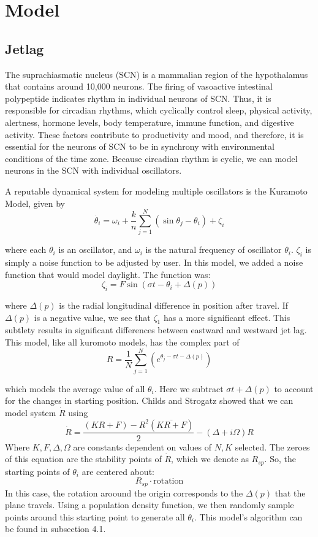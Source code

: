 \section{Model}
\subsection{Jetlag}
The suprachiasmatic nucleus (SCN) is a mammalian region of the hypothalamus that contains around 10,000 neurons. The firing of vasoactive intestinal polypeptide indicates rhythm in individual neurons of SCN. Thus, it is responsible for circadian rhythms, which cyclically control sleep, physical activity, alertness, hormone levels, body temperature, immune function, and digestive activity. These factors contribute to productivity and mood, and therefore, it is essential for the neurons of SCN to be in synchrony with environmental conditions of the time zone. Because circadian rhythm is cyclic, we can model neurons in the SCN with individual oscillators.

A reputable dynamical system for modeling multiple oscillators is the Kuramoto Model, given by
$$\dot{\theta_i} = \omega_i + \frac{k}{n} \sum_{j=1}^ {N}(\sin{\theta_j - \theta_i}) + \zeta_i$$

where each $\theta_i$ is an oscillator, and $\omega_i$ is the natural frequency of oscillator $\theta_i$. $\zeta_i$ is simply a noise function to be adjusted by user. In this model, we added a noise function that would model daylight. The function was: 
$$\zeta_i = F \sin(\sigma t - \theta_i + \Delta(p))$$ 

where $\Delta(p)$ is the radial longitudinal difference in position after travel. 
If $\Delta(p)$ is a negative value, we see that $\zeta_1$ has a more significant effect. This subtlety results in significant differences between eastward and westward jet lag. 
This model, like all kuromoto models, has the complex part of 
$$R = \frac{1}{N} \sum_{j=1}^N (e^{\theta_j - \sigma t - \Delta(p)})$$

which models the average value of all $\theta_i$. Here we subtract $\sigma t+ \Delta(p)$ to account for the changes in starting position. Childs and Strogatz showed that we can model system $\dot{R}$ using 
$$\dot{R} = \frac{(KR + F) - R^2(\overline{KR + F})}{2} - (\Delta + i\Omega)R$$
Where $K, F, \Delta, \Omega$ are constants dependent on values of $N, K$ selected.
The zeroes of this equation are the stability points of $\dot{R}$, which we denote as $R_{sp}$.
So, the starting points of $\theta_i$ are centered about:
$$R_{sp} \cdot \mathrm{rotation}$$
In this case, the rotation aroound the origin corresponds to the $\Delta(p)$ that the plane travels. 
Using a population density function, we then randomly sample points around this starting point to generate all $\theta_i$.
This model's algorithm can be found in subsection 4.1.

